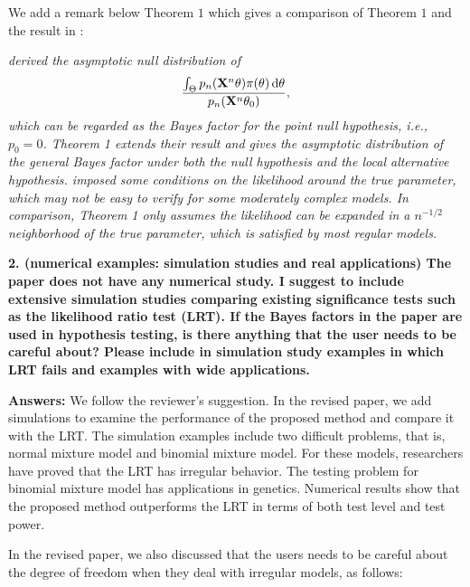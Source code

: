 \documentclass[11pt]{article}
\theoremstyle{plain}
\theoremstyle{definition}
\theoremstyle{remark}
\begin{document}
We add a remark below Theorem $1$ which gives a comparison of Theorem $1$ and the result in \cite{clarke1990information}:
\begin{adjustwidth}{1.5em}{1.5em}
    \emph{
            \cite{clarke1990information} 
            derived the asymptotic null distribution of 
            $$
            \frac{
                    {\int_{\Theta} p_n(\mathbf{X}^{n}\theta) \pi(\theta)\, \mathrm d\theta}
            }
            {p_n(\mathbf{X}^{n}\theta_0)}
            ,
            $$
            which can be regarded as the Bayes factor for the point null hypothesis, i.e., $p_0 = 0$.
            Theorem 1 extends their result and gives the asymptotic distribution of the general Bayes factor under both the null       hypothesis and the local alternative hypothesis.
            \cite{clarke1990information} imposed some conditions on the likelihood around the true parameter, which may not be easy to verify for some    moderately complex models.
            In comparison, Theorem 1 only assumes the likelihood can be expanded in a $n^{-1/2}$ neighborhood of the true parameter,   which is satisfied by most regular models.
}
\end{adjustwidth}

\textbf{
    2.
    (numerical examples: simulation studies and real applications) The paper does not have any numerical study. I suggest to include extensive simulation studies comparing existing significance tests such as the likelihood ratio test (LRT). If the Bayes factors in the paper are used in hypothesis testing, is there anything that the user needs to be careful about? Please include in simulation study examples in which LRT fails and examples with wide applications.
}

\textbf{Answers:}
We follow the reviewer's suggestion.
In the revised paper, we add simulations to examine the performance of the proposed method and compare it with the LRT.
The simulation examples include two difficult problems, that is, normal mixture model and binomial mixture model.
For these models, researchers have proved that the LRT has irregular behavior.
The testing problem for binomial mixture model has applications in genetics.
Numerical results show that the proposed method outperforms the LRT in terms of both test level and test power.

In the revised paper, we also discussed that the users needs to be careful about the degree of freedom when they deal with irregular models, as follows:
\end{document}
